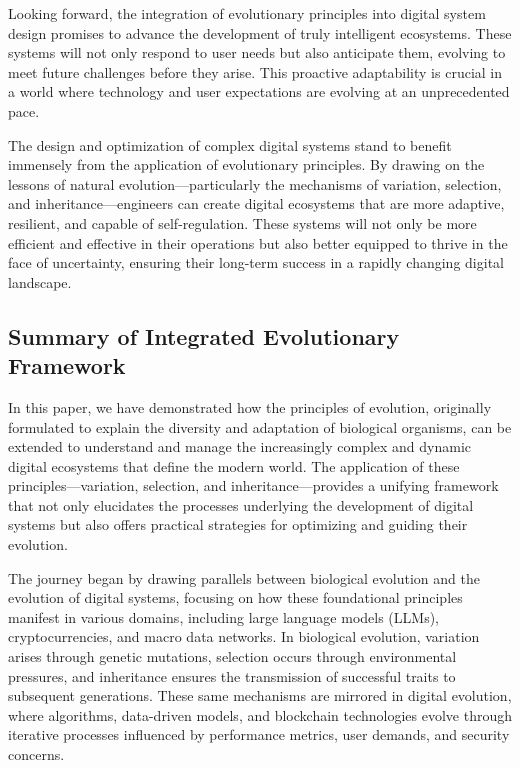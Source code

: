 \documentclass[12pt,twoside]{article}
\begin{document}
Looking forward, the integration of evolutionary principles into digital system design promises to advance the development of truly intelligent ecosystems. These systems will not only respond to user needs but also anticipate them, evolving to meet future challenges before they arise. This proactive adaptability is crucial in a world where technology and user expectations are evolving at an unprecedented pace.

The design and optimization of complex digital systems stand to benefit immensely from the application of evolutionary principles. By drawing on the lessons of natural evolution—particularly the mechanisms of variation, selection, and inheritance—engineers can create digital ecosystems that are more adaptive, resilient, and capable of self-regulation. These systems will not only be more efficient and effective in their operations but also better equipped to thrive in the face of uncertainty, ensuring their long-term success in a rapidly changing digital landscape.

\subsection{ Summary of Integrated Evolutionary Framework}

In this paper, we have demonstrated how the principles of evolution, originally formulated to explain the diversity and adaptation of biological organisms, can be extended to understand and manage the increasingly complex and dynamic digital ecosystems that define the modern world. The application of these principles—variation, selection, and inheritance—provides a unifying framework that not only elucidates the processes underlying the development of digital systems but also offers practical strategies for optimizing and guiding their evolution.

The journey began by drawing parallels between biological evolution and the evolution of digital systems, focusing on how these foundational principles manifest in various domains, including large language models (LLMs), cryptocurrencies, and macro data networks. In biological evolution, variation arises through genetic mutations, selection occurs through environmental pressures, and inheritance ensures the transmission of successful traits to subsequent generations. These same mechanisms are mirrored in digital evolution, where algorithms, data-driven models, and blockchain technologies evolve through iterative processes influenced by performance metrics, user demands, and security concerns.
\end{document}
